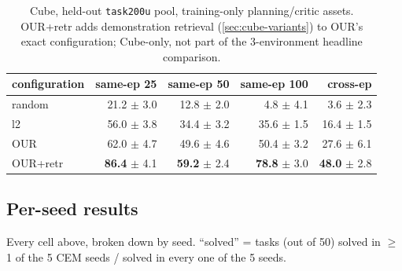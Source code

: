 \documentclass[11pt]{article}
\begin{document}
\begin{table}[H]
\centering\small
\caption{Cube, held-out \texttt{task200u} pool, training-only planning/critic assets.
OUR+retr adds demonstration retrieval (\cref{sec:cube-variants}) to OUR's exact
configuration; Cube-only, not part of the 3-environment headline comparison.}
\begin{tabular}{lrrrr}
\toprule
configuration & same-ep 25 & same-ep 50 & same-ep 100 & cross-ep \\
\midrule
random & 21.2 $\pm$ 3.0 & 12.8 $\pm$ 2.0 & 4.8 $\pm$ 4.1 & 3.6 $\pm$ 2.3 \\
l2 & 56.0 $\pm$ 3.8 & 34.4 $\pm$ 3.2 & 35.6 $\pm$ 1.5 & 16.4 $\pm$ 1.5 \\
OUR & 62.0 $\pm$ 4.7 & 49.6 $\pm$ 4.6 & 50.4 $\pm$ 3.2 & 27.6 $\pm$ 6.1 \\
OUR+retr & \textbf{86.4} $\pm$ 4.1 & \textbf{59.2} $\pm$ 2.4 & \textbf{78.8} $\pm$ 3.0 & \textbf{48.0} $\pm$ 2.8 \\
\bottomrule
\end{tabular}
\end{table}

\subsection*{Per-seed results}
Every cell above, broken down by seed. ``solved'' = tasks (out of 50) solved in
$\geq$1 of the 5 CEM seeds / solved in every one of the 5 seeds.
\end{document}

